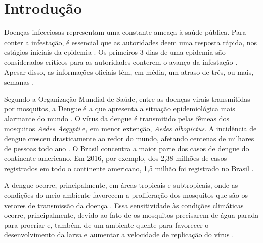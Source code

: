 \documentclass[12pt,openright,twoside,a4paper,article,brazil]{abntex2}
\subtitle{Trabalho de Conclusão da Disciplina Visualização de Dados}
\begin{document}
\frontmatter


\maketitle

\tableofcontents

\newpage

\mainmatter



\section{Introdução}
\label{sec:introducao}

Doenças infecciosas representam uma constante ameaça à saúde pública. Para conter a infestação, é essencial que as autoridades deem uma resposta rápida, nos estágios iniciais da epidemia \cite{social-surveillance}. Os primeiros 3 dias de uma epidemia são considerados críticos para as autoridades conterem o avanço da infestação \cite{internet-surveillance}. Apesar disso, as informações oficiais têm, em média, um atraso de três, ou mais, semanas \cite{forecasting-zika}.

Segundo a Organização Mundial de Saúde, entre as doenças virais transmitidas por mosquitos, a Dengue é a que apresenta a situação epidemiológica mais alarmante do mundo \cite{who-strategy-dengue-prevention}. O vírus da dengue é transmitido pelas fêmeas dos mosquitos \emph{Aedes Aegypti} e, em menor extenção, \emph{Aedes albopictus}. A incidência de dengue cresceu drasticamente ao redor do mundo, afetando centenas de milhares de pessoas todo ano \cite{who-dengue-website}. O Brasil concentra a maior parte dos casos de dengue do continente americano. Em 2016, por exemplo, dos 2,38 milhões de casos registrados em todo o continente americano, 1,5 milhão foi registrado no Brasil \cite{who-dengue-website}.

A dengue ocorre, principalmente, em áreas tropicais e subtropicais, onde as condições do meio ambiente favorecem a proliferação dos mosquitos que são os vetores de transmissão da doença \cite{ms-descricao-doenca}. Essa sensitividade às condições climáticas ocorre, principalmente, devido ao fato de os mosquitos precisarem de água parada para procriar e, também, de um ambiente quente para favorecer o desenvolvimento da larva e aumentar a velocidade de replicação do vírus \cite{effect-climate-dengue}.
\end{document}
